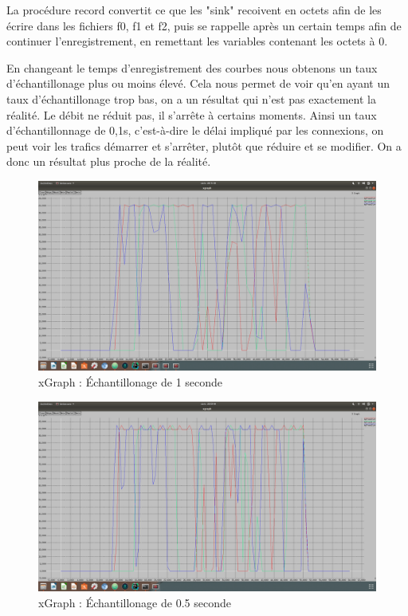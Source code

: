 \documentclass{article}
\begin{document}
    La procédure record convertit ce que les "sink" recoivent en octets afin de les écrire dans les fichiers f0, f1 et f2, puis se rappelle après un certain temps afin de continuer l'enregistrement, en remettant les variables contenant les octets à 0.

    En changeant le temps d'enregistrement des courbes nous obtenons un taux d'échantillonage plus ou moins élevé. Cela nous permet de voir qu'en ayant un taux d'échantillonage trop bas, on a un résultat qui n'est pas exactement la réalité. Le débit ne réduit pas, il s'arrête à certains moments. Ainsi un taux d'échantillonnage de 0,1s, c'est-à-dire le délai impliqué par les connexions, on peut voir les trafics démarrer et s'arrêter, plutôt que réduire et se modifier. On a donc un résultat plus proche de la réalité.
    \clearpage
    \begin{figure}
      \centering
        \includegraphics[width=0.99\columnwidth]{1,0.png}
        \caption{xGraph : Échantillonage de 1 seconde}
    \end{figure}

    \begin{figure}
      \centering
        \includegraphics[width=0.99\columnwidth]{0,5.png}
        \caption{xGraph : Échantillonage de 0.5 seconde}
    \end{figure}
\end{document}

